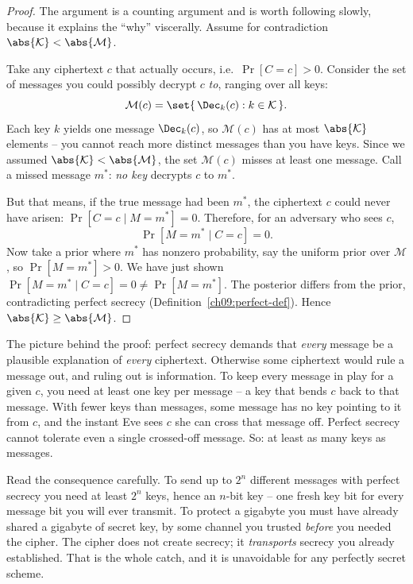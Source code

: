 \begin{proof}
The argument is a counting argument and is worth following slowly, because it explains the ``why'' viscerally. Assume for contradiction $\abs{\mathcal{K}} < \abs{\mathcal{M}}$.

Take any ciphertext $c$ that actually occurs, i.e.\ $\Pr[C = c] > 0$. Consider the set of messages you could possibly decrypt $c$ \emph{to}, ranging over all keys:
\[
  \mathcal{M}(c) = \set{\,\Dec_k(c) : k \in \mathcal{K}\,}.
\]
Each key $k$ yields one message $\Dec_k(c)$, so $\mathcal{M}(c)$ has at most $\abs{\mathcal{K}}$ elements -- you cannot reach more distinct messages than you have keys. Since we assumed $\abs{\mathcal{K}} < \abs{\mathcal{M}}$, the set $\mathcal{M}(c)$ misses at least one message. Call a missed message $m^{*}$: \emph{no key} decrypts $c$ to $m^{*}$.

But that means, if the true message had been $m^{*}$, the ciphertext $c$ could never have arisen: $\Pr[C = c \mid M = m^{*}] = 0$. Therefore, for an adversary who sees $c$,
\[
  \Pr[M = m^{*} \mid C = c] = 0.
\]
Now take a prior where $m^{*}$ has nonzero probability, say the uniform prior over $\mathcal{M}$, so $\Pr[M = m^{*}] > 0$. We have just shown $\Pr[M = m^{*} \mid C = c] = 0 \ne \Pr[M = m^{*}]$. The posterior differs from the prior, contradicting perfect secrecy (Definition~\ref{ch09:perfect-def}). Hence $\abs{\mathcal{K}} \ge \abs{\mathcal{M}}$.
\end{proof}

\begin{intuitionbox}
The picture behind the proof: perfect secrecy demands that \emph{every} message be a plausible explanation of \emph{every} ciphertext. Otherwise some ciphertext would rule a message out, and ruling out is information. To keep every message in play for a given $c$, you need at least one key per message -- a key that bends $c$ back to that message. With fewer keys than messages, some message has no key pointing to it from $c$, and the instant Eve sees $c$ she can cross that message off. Perfect secrecy cannot tolerate even a single crossed-off message. So: at least as many keys as messages.
\end{intuitionbox}

\begin{focusbox}
Read the consequence carefully. To send up to $2^n$ different messages with perfect secrecy you need at least $2^n$ keys, hence an $n$-bit key -- one fresh key bit for every message bit you will ever transmit. To protect a gigabyte you must have already shared a gigabyte of secret key, by some channel you trusted \emph{before} you needed the cipher. The cipher does not create secrecy; it \emph{transports} secrecy you already established. That is the whole catch, and it is unavoidable for any perfectly secret scheme.
\end{focusbox}

